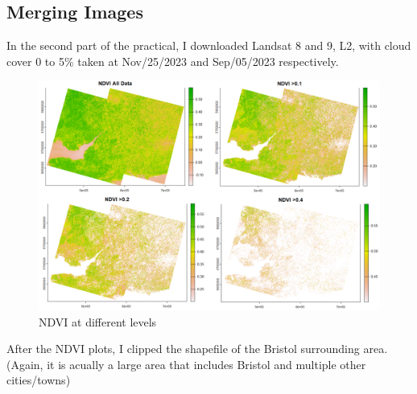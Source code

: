 \documentclass[
  letterpaper,
  DIV=11,
  numbers=noendperiod]{scrreprt}
\begin{document}
\hypertarget{merging-images}{%
\subsection*{Merging Images}\label{merging-images}}

In the second part of the practical, I downloaded Landsat 8 and 9, L2,
with cloud cover 0 to 5\% taken at Nov/25/2023 and Sep/05/2023
respectively.

\begin{figure}

{\centering \includegraphics[width=6.1875in,height=\textheight]{images/wk3/ndvi_allplots.png}

}

\caption{NDVI at different levels}

\end{figure}

After the NDVI plots, I clipped the shapefile of the Bristol surrounding
area. (Again, it is acually a large area that includes Bristol and
multiple other cities/towns)
\end{document}
